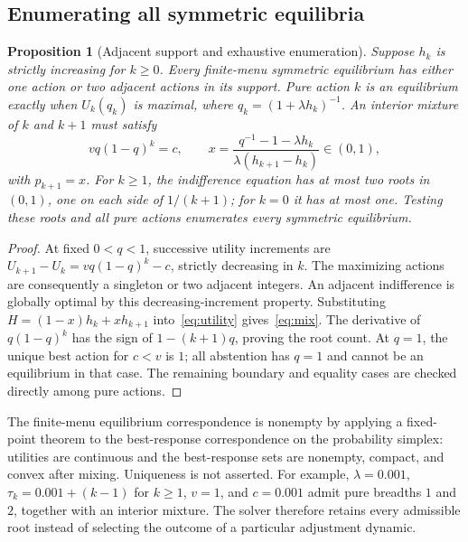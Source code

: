 \documentclass[11pt,a4paper]{article}
\newtheorem{proposition}[theorem]{Proposition}
\begin{document}
\subsection{Enumerating all symmetric equilibria}
\begin{proposition}[Adjacent support and exhaustive enumeration]\label{prop:enum}
Suppose $h_k$ is strictly increasing for $k\geq0$. Every finite-menu symmetric equilibrium has either one action or two adjacent actions in its support. Pure action $k$ is an equilibrium exactly when $U_k(q_k)$ is maximal, where $q_k=(1+\lambda h_k)^{-1}$. An interior mixture of $k$ and $k+1$ must satisfy
\begin{equation}
 vq(1-q)^k=c,\qquad
 x=\frac{q^{-1}-1-\lambda h_k}{\lambda(h_{k+1}-h_k)}\in(0,1),\label{eq:mix}
\end{equation}
with $p_{k+1}=x$. For $k\geq1$, the indifference equation has at most two roots in $(0,1)$, one on each side of $1/(k+1)$; for $k=0$ it has at most one. Testing these roots and all pure actions enumerates every symmetric equilibrium.
\end{proposition}
\begin{proof}
At fixed $0<q<1$, successive utility increments are
$U_{k+1}-U_k=vq(1-q)^k-c$, strictly decreasing in $k$. The maximizing actions are consequently a singleton or two adjacent integers. An adjacent indifference is globally optimal by this decreasing-increment property. Substituting $H=(1-x)h_k+xh_{k+1}$ into~\eqref{eq:utility} gives~\eqref{eq:mix}. The derivative of $q(1-q)^k$ has the sign of $1-(k+1)q$, proving the root count. At $q=1$, the unique best action for $c<v$ is $1$; all abstention has $q=1$ and cannot be an equilibrium in that case. The remaining boundary and equality cases are checked directly among pure actions.
\end{proof}

The finite-menu equilibrium correspondence is nonempty by applying a fixed-point theorem to the best-response correspondence on the probability simplex: utilities are continuous and the best-response sets are nonempty, compact, and convex after mixing. Uniqueness is not asserted. For example, $\lambda=0.001$, $\tau_k=0.001+(k-1)$ for $k\geq1$, $v=1$, and $c=0.001$ admit pure breadths $1$ and $2$, together with an interior mixture. The solver therefore retains every admissible root instead of selecting the outcome of a particular adjustment dynamic.
\end{document}
